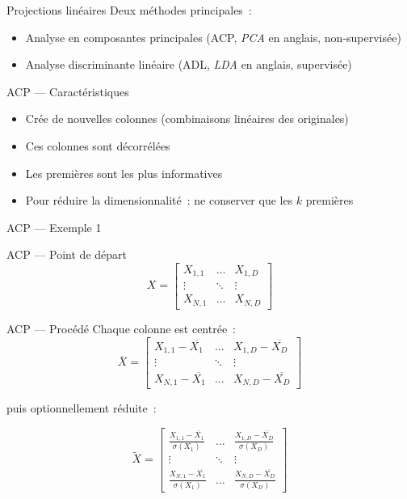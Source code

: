 \begin{frame}{Projections linéaires}
  Deux méthodes principales~:
  \begin{itemize}
    \item Analyse en composantes principales (ACP, \textit{PCA} en anglais, non-supervisée)
    \item Analyse discriminante linéaire (ADL, \textit{LDA} en anglais, supervisée)
  \end{itemize}
\end{frame}

\begin{frame}{ACP --- Caractéristiques}
  \begin{itemize}
    \item Crée de nouvelles colonnes (combinaisons linéaires des originales)
    \item Ces colonnes sont décorrélées
    \item Les premières sont les plus informatives
    \item Pour réduire la dimensionnalité~: ne conserver que les $k$ premières
  \end{itemize}
\end{frame}

\begin{frame}{ACP --- Exemple 1}
\end{frame}


\begin{frame}{ACP --- Point de départ}
  \[
  X = \begin{bmatrix}
    X_{1,1} & \dots  & X_{1,D} \\
    \vdots & \ddots & \vdots \\
    X_{N,1} & \dots  & X_{N,D}
  \end{bmatrix}
  \]
\end{frame}

\begin{frame}{ACP --- Procédé}
  Chaque colonne est centrée~:
  \[
  \overline{X} =
  \begin{bmatrix}
    X_{1,1}-\overline{X_1} & \dots  & X_{1,D}-\overline{X_D} \\
    \vdots & \ddots & \vdots \\
    X_{N,1}-\overline{X_1} & \dots  & X_{N,D}-\overline{X_D}
  \end{bmatrix}
  \]

  puis optionnellement réduite~:

  \[
  \widetilde{X} =
  \begin{bmatrix}
    \frac{X_{1,1}-\overline{X_1}}{\sigma(X_1)} & \dots  & \frac{X_{1,D}-\overline{X_D}}{\sigma(X_D)} \\
    \vdots & \ddots & \vdots \\
    \frac{X_{N,1}-\overline{X_1}}{\sigma(X_1)} & \dots  & \frac{X_{N,D}-\overline{X_D}}{\sigma(X_D)}
  \end{bmatrix}
  \]
\end{frame}

